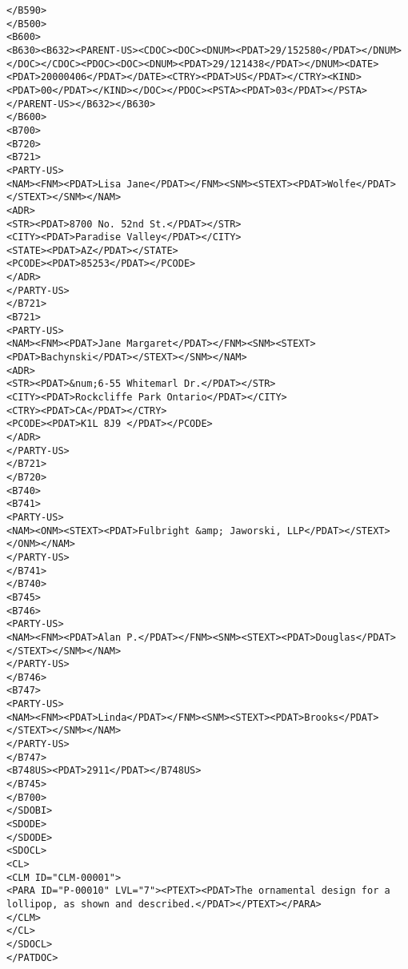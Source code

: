\begin{lstlisting}
</B590>
</B500>
<B600>
<B630><B632><PARENT-US><CDOC><DOC><DNUM><PDAT>29/152580</PDAT></DNUM></DOC></CDOC><PDOC><DOC><DNUM><PDAT>29/121438</PDAT></DNUM><DATE><PDAT>20000406</PDAT></DATE><CTRY><PDAT>US</PDAT></CTRY><KIND><PDAT>00</PDAT></KIND></DOC></PDOC><PSTA><PDAT>03</PDAT></PSTA></PARENT-US></B632></B630>
</B600>
<B700>
<B720>
<B721>
<PARTY-US>
<NAM><FNM><PDAT>Lisa Jane</PDAT></FNM><SNM><STEXT><PDAT>Wolfe</PDAT></STEXT></SNM></NAM>
<ADR>
<STR><PDAT>8700 No. 52nd St.</PDAT></STR>
<CITY><PDAT>Paradise Valley</PDAT></CITY>
<STATE><PDAT>AZ</PDAT></STATE>
<PCODE><PDAT>85253</PDAT></PCODE>
</ADR>
</PARTY-US>
</B721>
<B721>
<PARTY-US>
<NAM><FNM><PDAT>Jane Margaret</PDAT></FNM><SNM><STEXT><PDAT>Bachynski</PDAT></STEXT></SNM></NAM>
<ADR>
<STR><PDAT>&num;6-55 Whitemarl Dr.</PDAT></STR>
<CITY><PDAT>Rockcliffe Park Ontario</PDAT></CITY>
<CTRY><PDAT>CA</PDAT></CTRY>
<PCODE><PDAT>K1L 8J9 </PDAT></PCODE>
</ADR>
</PARTY-US>
</B721>
</B720>
<B740>
<B741>
<PARTY-US>
<NAM><ONM><STEXT><PDAT>Fulbright &amp; Jaworski, LLP</PDAT></STEXT></ONM></NAM>
</PARTY-US>
</B741>
</B740>
<B745>
<B746>
<PARTY-US>
<NAM><FNM><PDAT>Alan P.</PDAT></FNM><SNM><STEXT><PDAT>Douglas</PDAT></STEXT></SNM></NAM>
</PARTY-US>
</B746>
<B747>
<PARTY-US>
<NAM><FNM><PDAT>Linda</PDAT></FNM><SNM><STEXT><PDAT>Brooks</PDAT></STEXT></SNM></NAM>
</PARTY-US>
</B747>
<B748US><PDAT>2911</PDAT></B748US>
</B745>
</B700>
</SDOBI>
<SDODE>
</SDODE>
<SDOCL>
<CL>
<CLM ID="CLM-00001">
<PARA ID="P-00010" LVL="7"><PTEXT><PDAT>The ornamental design for a lollipop, as shown and described.</PDAT></PTEXT></PARA>
</CLM>
</CL>
</SDOCL>
</PATDOC>

\end{lstlisting}